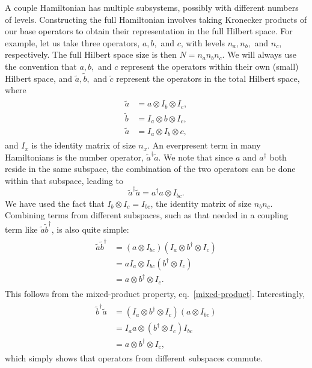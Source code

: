 \documentclass{article}
\begin{document}
A couple Hamiltonian has multiple subsystems, possibly with different numbers of levels.
Constructing the full Hamiltonian involves taking Kronecker products of our base operators
to obtain their representation in the full Hilbert space. For example, let us take three operators,
$a, b,$ and $c$, with levels $n_a, n_b,$ and $n_c$, respectively. 
The full Hilbert space size
is then $N = n_a n_b n_c$. We will always use the convention that $a, b,$ and $c$ represent
the operators within their own (small) Hilbert space, and $\tilde{a}, \tilde{b},$ and
$\tilde{c}$ represent the operators in the total Hilbert space, where
\begin{align}\label{fullop}
  \begin{split}
    \tilde{a} &= a \otimes I_b \otimes I_c,\\
    \tilde{b} &= I_a \otimes b \otimes I_c,\\
    \tilde{a} &= I_a \otimes I_b \otimes c,
  \end{split}
\end{align}
and $I_x$ is the identity matrix of size $n_x$.
An everpresent term in many Hamiltonians is the
number operator, $\tilde{a}^\dagger \tilde{a}$. We note that since $a$ and $a^\dagger$ both
reside in the same subspace, the combination of the two operators can be done within
that subspace, leading to
\begin{equation}
  \tilde{a}^\dagger \tilde{a} = a^\dagger a \otimes I_{bc}.
\end{equation}
We have used the fact that $I_b \otimes I_c = I_{bc}$, the identity matrix of size
$n_b n_c$. Combining terms from different subspaces, such as that needed in
a coupling term like $\tilde{a} \tilde{b}^\dagger$, is also quite simple:
\begin{align}
  \begin{split}
    \tilde{a} \tilde{b}^\dagger &= (a \otimes I_{bc})(I_a \otimes b^\dagger \otimes I_c)\\
    &= a I_a \otimes I_{bc} (b^\dagger\otimes I_c) \\
    &= a \otimes b^\dagger \otimes I_c.
  \end{split}
\end{align}
This follows from the mixed-product property, eq.~\ref{mixed-product}. Interestingly,
\begin{align}\label{multiop}
  \begin{split}
    \tilde{b}^\dagger \tilde{a} &= (I_a \otimes b^\dagger \otimes I_c)(a \otimes I_{bc})\\
    &= I_a a \otimes (b^\dagger\otimes I_c) I_{bc}  \\
    &= a \otimes b^\dagger \otimes I_c,
  \end{split}
\end{align}
which simply shows that operators from different subspaces commute.
\end{document}
